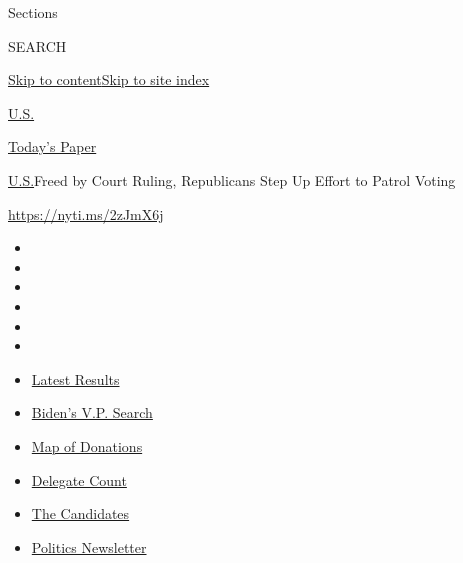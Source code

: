 Sections

SEARCH

\protect\hyperlink{site-content}{Skip to
content}\protect\hyperlink{site-index}{Skip to site index}

\href{https://www.nytimes.com/section/us}{U.S.}

\href{https://myaccount.nytimes.com/auth/login?response_type=cookie\&client_id=vi}{}

\href{https://www.nytimes.com/section/todayspaper}{Today's Paper}

\href{/section/us}{U.S.}\textbar{}Freed by Court Ruling, Republicans
Step Up Effort to Patrol Voting

\url{https://nyti.ms/2zJmX6j}

\begin{itemize}
\item
\item
\item
\item
\item
\item
\end{itemize}

\begin{itemize}
\item
  \href{https://www.nytimes.com/interactive/2020/08/04/us/elections/results-arizona-kansas-michigan-missouri-primaries.html?action=click\&pgtype=Article\&state=default\&region=TOP_BANNER\&context=storylines_menu}{Latest
  Results}
\item
  \href{https://www.nytimes.com/article/biden-vice-president-2020.html?action=click\&pgtype=Article\&state=default\&region=TOP_BANNER\&context=storylines_menu}{Biden's
  V.P. Search}
\item
  \href{https://www.nytimes.com/interactive/2020/07/24/us/politics/trump-biden-campaign-donors.html?action=click\&pgtype=Article\&state=default\&region=TOP_BANNER\&context=storylines_menu}{Map
  of Donations}
\item
  \href{https://www.nytimes.com/interactive/2020/us/elections/delegate-count-primary-results.html?action=click\&pgtype=Article\&state=default\&region=TOP_BANNER\&context=storylines_menu}{Delegate
  Count}
\item
  \href{https://www.nytimes.com/interactive/2019/us/politics/2020-presidential-candidates.html?action=click\&pgtype=Article\&state=default\&region=TOP_BANNER\&context=storylines_menu}{The
  Candidates}
\item
  \href{https://www.nytimes.com/newsletters/politics?action=click\&pgtype=Article\&state=default\&region=TOP_BANNER\&context=storylines_menu}{Politics
  Newsletter}
\end{itemize}

